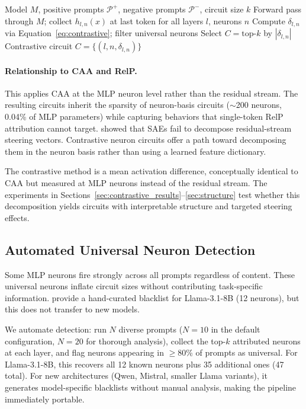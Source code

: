\documentclass[11pt]{article}
\begin{document}
\begin{algorithm}[htbp]
\caption{Contrastive Neuron Discovery}
\label{alg:contrastive}
\begin{algorithmic}[1]
\REQUIRE Model $M$, positive prompts $\mathcal{P}^+$, negative prompts $\mathcal{P}^-$, circuit size $k$
    \STATE Forward pass through $M$; collect $h_{l,n}(x)$ at last token for all layers $l$, neurons $n$
\ENDFOR
\STATE Compute $\delta_{l,n}$ via Equation~\ref{eq:contrastive}; filter universal neurons
\STATE Select $C = \text{top-}k$ by $|\delta_{l,n}|$
\RETURN Contrastive circuit $C = \{(l, n, \delta_{l,n})\}$
\end{algorithmic}
\end{algorithm}

\paragraph{Relationship to CAA and RelP.}
This applies CAA at the MLP neuron level rather than the residual stream.
The resulting circuits inherit the sparsity of neuron-basis circuits (${\sim}$200 neurons, 0.04\% of MLP parameters) while capturing behaviors that single-token RelP attribution cannot target.
\citet{mayne2024sae_steering} showed that SAEs fail to decompose residual-stream steering vectors. Contrastive neuron circuits offer a path toward decomposing them in the neuron basis rather than using a learned feature dictionary.

The contrastive method is a mean activation difference, conceptually identical to CAA but measured at MLP neurons instead of the residual stream.
The experiments in Sections~\ref{sec:contrastive_results}--\ref{sec:structure} test whether this decomposition yields circuits with interpretable structure and targeted steering effects.

\subsection{Automated Universal Neuron Detection}
\label{sec:blacklist}

Some MLP neurons fire strongly across all prompts regardless of content.
These universal neurons inflate circuit sizes without contributing task-specific information.
\citet{arora2025circuits} provide a hand-curated blacklist for Llama-3.1-8B (12 neurons), but this does not transfer to new models.

We automate detection: run $N$ diverse prompts ($N{=}10$ in the default configuration, $N{=}20$ for thorough analysis), collect the top-$k$ attributed neurons at each layer, and flag neurons appearing in $\geq$80\% of prompts as universal.
For Llama-3.1-8B, this recovers all 12 known neurons plus 35 additional ones (47 total).
For new architectures (Qwen, Mistral, smaller Llama variants), it generates model-specific blacklists without manual analysis, making the pipeline immediately portable.
\end{document}
